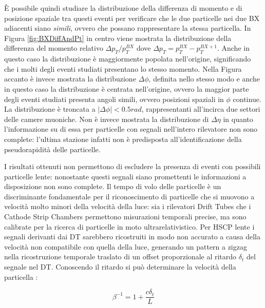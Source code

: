 È possibile quindi studiare la distribuzione della differenza di momento e di posizione spaziale tra questi eventi per verificare che le due particelle nei due BX adiacenti siano \textit{simili}, ovvero che possano rappresentare la stessa particella. In Figura \ref{fig:BXDiffAndPt} in centro viene mostrata la distribuzione della differenza del momento relativo $\Delta p_T/p_T^{BX}$ dove $\Delta p_T = p_T^{BX} - p_T^{BX+1}$. Anche in questo caso la distribuzione è maggiormente popolata nell'origine, significando che i molti degli eventi studiati presentano lo stesso momento. \newline
Nella Figura accanto è invece mostrata la distribuzione $\Delta \phi$, definita nello stesso modo e anche in questo caso la distribuzione è centrata nell'origine, ovvero la maggior parte degli eventi studiati presenta angoli simili, ovvero posizioni spaziali in $\phi$ continue. La distribuzione è troncata a $|\Delta \phi| < 0.5 \si{rad}$, rappresentanti all'incirca due settori delle camere muoniche. \newline
Non è invece mostrata la distribuzione di $\Delta \eta$ in quanto l'informazione su di essa per particelle con segnali nell'intero rilevatore non sono complete: l'ultima stazione infatti non è predisposta all'identificazione della pseudorapidità delle particelle. 




I risultati ottenuti non permettono di escludere la presenza di eventi con possibili particelle lente: nonostante questi segnali siano promettenti le informazioni a disposizione non sono complete. Il tempo di volo delle particelle è un discriminante fondamentale per il riconoscimento di particelle che si muovono a velocità molto minori della velocità della luce: sia i rilevatori Drift Tubes che i Cathode Strip Chambers permettono misurazioni temporali precise, ma sono calibrate per la ricerca di particelle in moto ultrarelativistico. Per HSCP lente i segnali derivanti dai DT sarebbero ricostruiti in modo non accurato a causa della velocità non compatibile con quella della luce, generando un pattern a zigzag nella ricostruzione temporale traslato di un offset proporzionale al ritardo $\delta_t$ del segnale nel DT. Conoscendo il ritardo si può determinare la velocità della particella \cite{CMS-PAS-EXO-16-036}:

\begin{equation}
  \label{eq:Velocity}
  \beta^{-1} = 1 + \frac{c\delta_t}{L}
\end{equation}

